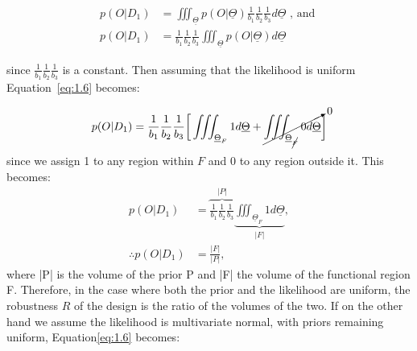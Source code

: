 \begin{align}
p(O|D_1) &= \displaystyle \iiint_{\underline{\Theta}} p(O|\underline{\Theta})\frac{1}{b_1}\frac{1}{b_2}\frac{1}{b_3}d\underline{\Theta} \text{ , and }\\
p(O|D_1) &= \frac{1}{b_1}\frac{1}{b_2}\frac{1}{b_3} \displaystyle \iiint_{\underline{\Theta}}p(O|\underline{\Theta})d\underline{\Theta} \label{eq:1.6}
\end{align}

\noindent since $\frac{1}{b_1}\frac{1}{b_2}\frac{1}{b_3} $ is a constant. Then assuming that the likelihood is uniform Equation~\ref{eq:1.6} becomes:

\begin{align}
p(O|D_1) &= \frac{1}{b_1}\frac{1}{b_2}\frac{1}{b_3} \bigg[\displaystyle \iiint_{\underline{\Theta}_F} 1 d\underline{\Theta} +\cancelto{0}{\displaystyle \iiint_{\underline{\Theta}_{\cancel{F} }} 0 d\underline{\Theta}}\bigg]  \\
\end{align}
\noindent since we assign 1 to any region within $F$ and 0 to any region outside it. This becomes:
\begin{align}
p(O|D_1) &= \overbrace{\frac{1}{b_1}\frac{1}{b_2}\frac{1}{b_3}}^{|P|} \underbrace{\displaystyle \iiint_{\underline{\Theta}_F} 1 d\underline{\Theta}}_{|F|}, \\
\therefore p(O|D_1) &= \frac{|F|}{|P|},
\end{align}
where |P| is the volume of the prior P and |F| the volume of the functional region F. Therefore, in the case where both the prior and the likelihood are uniform, the robustness $R$ of the design is the ratio of the volumes of the two. If on the other hand we assume the likelihood is multivariate normal, with priors remaining uniform, Equation\ref{eq:1.6} becomes: 





